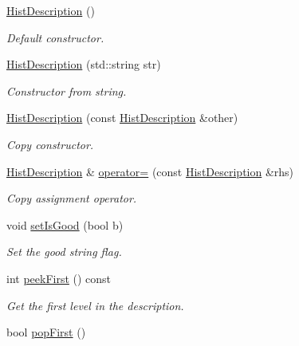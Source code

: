 \begin{DoxyCompactItemize}
\item 
\hyperlink{classsubpavings_1_1HistDescription_aa037991228f9fc3595310b7d9a645a6b}{\-Hist\-Description} ()
\begin{DoxyCompactList}\small\item\em \-Default constructor. \end{DoxyCompactList}\item 
\hyperlink{classsubpavings_1_1HistDescription_adacde2a48f78ab90db0bdd251f0d13ab}{\-Hist\-Description} (std\-::string str)
\begin{DoxyCompactList}\small\item\em \-Constructor from string. \end{DoxyCompactList}\item 
\hyperlink{classsubpavings_1_1HistDescription_a132244f2567c62a6b481ec3fa93ebe5e}{\-Hist\-Description} (const \hyperlink{classsubpavings_1_1HistDescription}{\-Hist\-Description} \&other)
\begin{DoxyCompactList}\small\item\em \-Copy constructor. \end{DoxyCompactList}\item 
\hyperlink{classsubpavings_1_1HistDescription}{\-Hist\-Description} \& \hyperlink{classsubpavings_1_1HistDescription_a6982d4933571625373952ffe5f7e9d4f}{operator=} (const \hyperlink{classsubpavings_1_1HistDescription}{\-Hist\-Description} \&rhs)
\begin{DoxyCompactList}\small\item\em \-Copy assignment operator. \end{DoxyCompactList}\item 
void \hyperlink{classsubpavings_1_1HistDescription_ade9e4041c1ca6de14b2b82ff7c7465e1}{set\-Is\-Good} (bool b)
\begin{DoxyCompactList}\small\item\em \-Set the good string flag. \end{DoxyCompactList}\item 
int \hyperlink{classsubpavings_1_1HistDescription_a8f53638ba1ddc56e63174d18510d92af}{peek\-First} () const 
\begin{DoxyCompactList}\small\item\em \-Get the first level in the description. \end{DoxyCompactList}\item 
bool \hyperlink{classsubpavings_1_1HistDescription_a493c821ce318a6a4d950ea73c1f7ff11}{pop\-First} ()

\end{DoxyCompactItemize}
